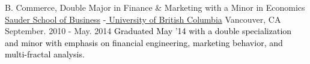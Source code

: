 \begin{cventries}
	\cventry
	{B. Commerce, Double Major in Finance \& Marketing with a Minor in Economics} %
	{\href{http://www.sauder.ubc.ca/}{Sauder School of Business} -\href{http://www.ubc.ca/}{ University of British Columbia}}
	{Vancouver, CA} %
	{September. 2010 - May. 2014} %
	{
		\textcolor{black}{  Graduated May '14 with a double specialization and minor with emphasis on financial engineering, marketing behavior, and multi-fractal analysis.} \newline\newline\newline
	}

\end{cventries}
